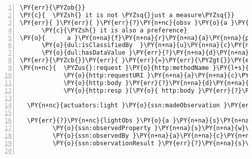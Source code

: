 \expandafter\def\csname PY@tok@err\endcsname{}
{\small
\begin{Verbatim}[commandchars=\\\{\},numbers=left,firstnumber=1,stepnumber=1]
\PY{err}{\PYZob{}}
\PY{c}{  \PYZsh{} it is not \PYZsq{}just a measure\PYZsq{}}
\PY{err}{ }\PY{err}{ }\PY{err}{?}\PY{n+nc}{obsv }\PY{o}{a }\PY{n+na}{s}\PY{n+na}{s}\PY{n+na}{n}\PY{n+na}{:}\PY{n+na}{O}\PY{n+na}{b}\PY{n+na}{s}\PY{n+na}{e}\PY{n+na}{r}\PY{n+na}{v}\PY{n+na}{a}\PY{n+na}{t}\PY{n+na}{i}\PY{n+na}{o}\PY{n+na}{n}\PY{n+na}{V}\PY{n+na}{a}\PY{n+na}{l}\PY{n+na}{u}\PY{n+na}{e };
      \PY{c}{\PYZsh{} it is also a preference}
\PY{o}{      a }\PY{n+na}{f}\PY{n+na}{r}\PY{n+na}{a}\PY{n+na}{p}\PY{n+na}{:}\PY{n+na}{P}\PY{n+na}{r}\PY{n+na}{e}\PY{n+na}{f}\PY{n+na}{e}\PY{n+na}{r}\PY{n+na}{e}\PY{n+na}{n}\PY{n+na}{c}\PY{n+na}{e };
      \PY{o}{dul:isClassifiedBy  }\PY{n+na}{u}\PY{n+na}{c}\PY{n+na}{u}\PY{n+na}{m}\PY{n+na}{:}\PY{n+na}{l}\PY{n+na}{u}\PY{n+na}{x };
      \PY{o}{dul:hasDataValue }\PY{err}{?}\PY{n+na}{d}\PY{n+na}{e}\PY{n+na}{s}\PY{n+na}{i}\PY{n+na}{r}\PY{n+na}{e}\PY{n+na}{d}\PY{n+na}{\PYZus{}}\PY{n+na}{v}\PY{n+na}{a}\PY{n+na}{l}\PY{n+na}{u}\PY{n+na}{e }.
\PY{err}{\PYZcb{}}\PY{err}{ }\PY{err}{=}\PY{err}{\PYZgt{}}\PY{err}{ }\PY{err}{\PYZob{}}
\PY{n+nc}{  \PYZus{}:request }\PY{o}{http:methodName }\PY{l+s}{\PYZdq{}POST\PYZdq{}};
            \PY{o}{http:requestURI }\PY{n+na}{a}\PY{n+na}{c}\PY{n+na}{t}\PY{n+na}{u}\PY{n+na}{a}\PY{n+na}{t}\PY{n+na}{o}\PY{n+na}{r}\PY{n+na}{s}\PY{n+na}{:}\PY{n+na}{l}\PY{n+na}{i}\PY{n+na}{g}\PY{n+na}{h}\PY{n+na}{t };
            \PY{o}{http:body }\PY{err}{?}\PY{n+na}{d}\PY{n+na}{e}\PY{n+na}{s}\PY{n+na}{i}\PY{n+na}{r}\PY{n+na}{e}\PY{n+na}{d}\PY{n+na}{\PYZus{}}\PY{n+na}{v}\PY{n+na}{a}\PY{n+na}{l}\PY{n+na}{u}\PY{n+na}{e };
            \PY{o}{http:resp }[\PY{o}{ http:body }\PY{err}{?}\PY{n+na}{l}\PY{n+na}{i}\PY{n+na}{g}\PY{n+na}{h}\PY{n+na}{t}\PY{n+na}{O}\PY{n+na}{b}\PY{n+na}{s }].
  
  \PY{n+nc}{actuators:light }\PY{o}{ssn:madeObservation }\PY{err}{?}\PY{n+na}{l}\PY{n+na}{i}\PY{n+na}{g}\PY{n+na}{h}\PY{n+na}{t}\PY{n+na}{O}\PY{n+na}{b}\PY{n+na}{s }.
  
  \PY{err}{?}\PY{n+nc}{lightObs }\PY{o}{a }\PY{n+na}{s}\PY{n+na}{s}\PY{n+na}{n}\PY{n+na}{:}\PY{n+na}{O}\PY{n+na}{b}\PY{n+na}{s}\PY{n+na}{e}\PY{n+na}{r}\PY{n+na}{v}\PY{n+na}{a}\PY{n+na}{t}\PY{n+na}{i}\PY{n+na}{o}\PY{n+na}{n };
         \PY{o}{ssn:observedProperty }\PY{n+na}{s}\PY{n+na}{w}\PY{n+na}{e}\PY{n+na}{e}\PY{n+na}{t}\PY{n+na}{:}\PY{n+na}{L}\PY{n+na}{i}\PY{n+na}{g}\PY{n+na}{h}\PY{n+na}{t };
         \PY{o}{ssn:observedBy }\PY{n+na}{a}\PY{n+na}{c}\PY{n+na}{t}\PY{n+na}{u}\PY{n+na}{a}\PY{n+na}{t}\PY{n+na}{o}\PY{n+na}{r}\PY{n+na}{s}\PY{n+na}{:}\PY{n+na}{l}\PY{n+na}{i}\PY{n+na}{g}\PY{n+na}{h}\PY{n+na}{t };
         \PY{o}{ssn:observationResult }\PY{err}{?}\PY{n+na}{s}\PY{n+na}{o }.
     

\end{Verbatim}}

